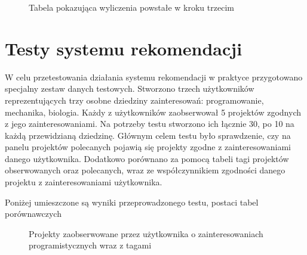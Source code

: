 \begin{figure}[h!]
	\caption{Tabela pokazująca wyliczenia powstałe w kroku trzecim}
	\centering
\end{figure}

\clearpage

\section{Testy systemu rekomendacji}

W celu przetestowania działania systemu rekomendacji w praktyce przygotowano specjalny zestaw danych testowych. Stworzono trzech użytkowników reprezentujących trzy osobne dziedziny zainteresowań: programowanie, mechanika, biologia. Każdy z użytkowników zaobserwował 5 projektów zgodnych z jego zainteresowaniami. Na potrzeby testu stworzono ich łącznie 30, po 10 na każdą przewidzianą dziedzinę. 
Głównym celem testu było sprawdzenie, czy na panelu projektów polecanych pojawią się projekty zgodne z zainteresowaniami danego użytkownika. Dodatkowo porównano za pomocą tabeli tagi projektów obserwowanych oraz polecanych, wraz ze współczynnikiem zgodności danego projektu z zainteresowaniami użytkownika. 


Poniżej umieszczone są wyniki przeprowadzonego testu, postaci tabel porównawczych

\begin{figure}[h!]
	\caption{Projekty zaobserwowane przez użytkownika o zainteresowaniach programistycznych wraz z tagami}
	\centering
\end{figure}

